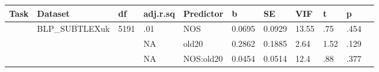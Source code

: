 \begin{table}[ht]
\centering
\begingroup\normalsize
\begin{tabular}{lllllllllll}
  \hline
Task & Dataset & df & adj.r.sq & Predictor & b & SE & VIF & t & p &  \\ 
  \hline
 & BLP\_SUBTLEXuk & 5191 & .01 & NOS & 0.0695 & 0.0929 & 13.55 & .75 & .454 &   \\ 
   &  &  & NA & old20 & 0.2862 & 0.1885 & 2.64 & 1.52 & .129 &   \\ 
   &  &  & NA & NOS:old20 & 0.0454 & 0.0514 & 12.4 & .88 & .377 &   \\ 
   \hline
\end{tabular}
\endgroup
\end{table}
